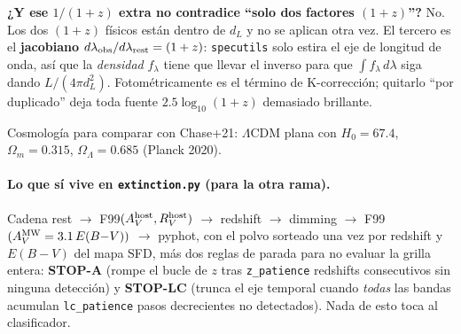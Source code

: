 \documentclass[11pt,a4paper]{article}
\newcommand{\code}[1]{\texttt{\small #1}}
\newlength{\examenpad}
\newenvironment{examen}
  {\par\medskip\noindent
   \begin{lrbox}{\examenbox}%
   \begin{minipage}{\dimexpr\linewidth-2\examenpad}\small}
  {\end{minipage}%
   \end{lrbox}%
   {\setlength{\fboxsep}{\examenpad}\colorbox{boxgray}{\usebox{\examenbox}}}%
   \par\medskip}
\begin{document}
\begin{examen}
\textbf{¿Y ese $1/(1+z)$ extra no contradice ``solo dos factores $(1+z)$''?} No. Los dos $(1+z)$
físicos están dentro de $d_L$ y no se aplican otra vez. El tercero es el \textbf{jacobiano}
$d\lambda_{\rm obs}/d\lambda_{\rm rest} = (1+z)$: \code{specutils} solo estira el eje de longitud de
onda, así que la \emph{densidad} $f_\lambda$ tiene que llevar el inverso para que
$\int f_\lambda\,d\lambda$ siga dando $L/(4\pi d_L^2)$. Fotométricamente es el término de
K-corrección; quitarlo ``por duplicado'' deja toda fuente $2.5\log_{10}(1+z)$ demasiado brillante.
\end{examen}

Cosmología para comparar con Chase+21: $\Lambda$CDM plana con $H_0=67.4$, $\Omega_m=0.315$,
$\Omega_\Lambda=0.685$ (Planck 2020).

\paragraph{Lo que sí vive en \code{extinction.py} (para la otra rama).} Cadena
rest $\to$ F99$(A_V^{\rm host}, R_V^{\rm host})$ $\to$ redshift $\to$ dimming $\to$
F99$(A_V^{\rm MW}=3.1\,E(B{-}V))$ $\to$ pyphot, con el polvo sorteado una vez por redshift y
$E(B{-}V)$ del mapa SFD, más dos reglas de parada para no evaluar la grilla entera: \textbf{STOP-A}
(rompe el bucle de $z$ tras \code{z\_patience} redshifts consecutivos sin ninguna detección) y
\textbf{STOP-LC} (trunca el eje temporal cuando \emph{todas} las bandas acumulan \code{lc\_patience}
pasos decrecientes no detectados). Nada de esto toca al clasificador.
\end{document}
